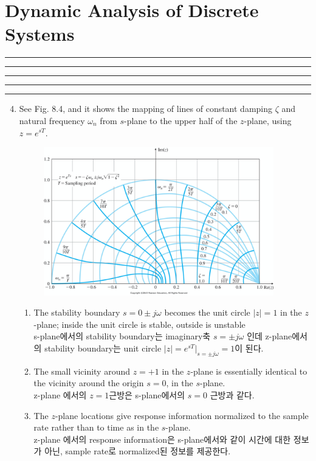 \setcounter{chapter}{7}
\setcounter{section}{1}
\section{Dynamic Analysis of Discrete Systems}
\vspace{-8pt} \hrule \hrule \hrule \hrule \hrule  \vspace{12pt}
	\begin{enumerate}
		\setcounter{enumi}{3}
\item See Fig. 8.4, and it shows the mapping of lines of constant damping $\zeta$ and natural frequency $\omega_n$ from $s$-plane to the upper half of the $z$-plane, using $z = e^{sT}$. 
		\begin{figure}[h]
		    \centering
			\includegraphics[width=10cm]{./FIG_Franklin/fig8-4.png}
		\end{figure}
		\begin{enumerate}
			\item The stability boundary $s= 0 \pm j\omega$ becomes the unit circle $|z| =1$ in the $z$-plane; inside the unit circle is stable, outside is unstable\\
			s-plane에서의 stability boundary는 imaginary축 $s = \pm j\omega$ 인데 z-plane에서의 stability boundary는 unit circle $|z|=e^{sT}|_{s=\pm j \omega }= 1 $이 된다.
			\item The small vicinity around $z=+1$ in the $z$-plane is essentially identical to the vicinity around the origin $s=0$, in the $s$-plane.\\
			z-plane 에서의 $z=1$근방은 s-plane에서의 $s=0$ 근방과 같다.
			\item The $z$-plane locations give response information normalized to the sample rate rather than to time as in the $s$-plane. \\
			z-plane 에서의 response information은 s-plane에서와 같이 시간에 대한 정보가 아닌, sample rate로 normalized된 정보를 제공한다.

\end{enumerate}
\end{enumerate}
